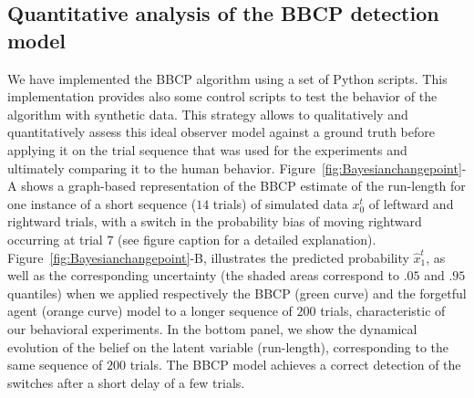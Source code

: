 \documentclass[10pt,letterpaper]{article}
\newcommand{\seeFig}[1]{Figure~\ref{fig:#1}}
\newcommand{\seeApp}[1]{Appendix~\ref{app:#1}}
\newcommand{\CP}[1]{\textbf{\textcolor{green}{[CP: #1]}}}
\begin{document}
\subsection{Quantitative analysis of the BBCP detection model}
We have implemented
the BBCP algorithm %
using a set of Python scripts.
This implementation provides also some control scripts
to test the behavior of the algorithm with synthetic data.
This strategy allows to qualitatively and quantitatively assess
this ideal observer model against a ground truth before applying it
on the trial sequence that was used for the experiments and
ultimately comparing it to the human behavior. %
\seeFig{Bayesianchangepoint}-A shows a graph-based representation of the BBCP estimate of the run-length for one instance of a short sequence ($14$ trials) of simulated data $x_0^t$
of leftward and rightward trials, with a switch in the probability bias
of moving rightward occurring at trial $7$ (see figure caption for a detailed explanation).
\seeFig{Bayesianchangepoint}-B, illustrates the predicted probability $\hat{x}_1^t$, as well as the corresponding uncertainty (the shaded areas correspond to $.05$ and $.95$ quantiles) when
we applied respectively the BBCP (green curve) and the forgetful agent (orange curve) model to
a longer sequence of $200$ trials,
characteristic of our behavioral experiments.
In the bottom panel,
we show the dynamical evolution of the belief on the latent variable (run-length),
corresponding to the same sequence of $200$ trials.
The BBCP model achieves a correct detection of the switches after a short delay of a few trials.
\end{document}
